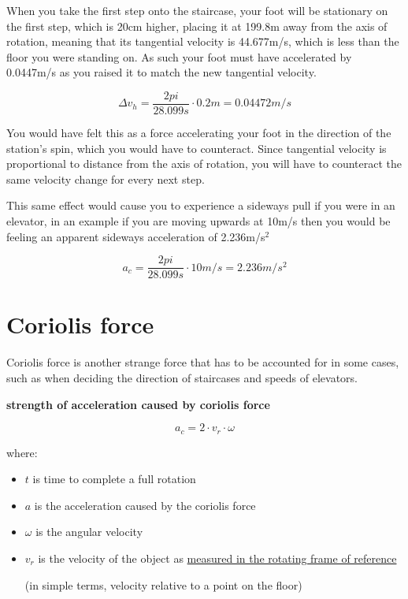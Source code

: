 \documentclass[a4paper]{article}
\begin{document}
	\medskip
	
	When you take the first step onto the staircase, your foot will be stationary on the first step, which is 20cm higher, placing it at 199.8m away from the axis of rotation, meaning that its tangential velocity is 44.677m/s, which is less than the floor you were standing on. As such your foot must have accelerated by 0.0447m/s as you raised it to match the new tangential velocity.
	
	$$ \Delta v_h = \frac{2pi}{28.099s} \cdot 0.2m = 0.04472m/s $$
	
	You would have felt this as a force accelerating your foot in the direction of the station's spin, which you would have to counteract. Since tangential velocity is proportional to distance from the axis of rotation, you will have to counteract the same velocity change for every next step.
	
	\medskip
	
	This same effect would cause you to experience a sideways pull if you were in an elevator, in an example if you are moving upwards at 10m/s then you would be feeling an apparent sideways acceleration of 2.236m/s$^2$
	
	$$ a_c = \frac{2pi}{28.099s} \cdot 10m/s = 2.236m/s^2 $$
	
	\pagebreak
	
	\iffalse
	
	\section{Coriolis force}
	
	Coriolis force is another strange force that has to be accounted for in some cases, such as when deciding the direction of staircases and speeds of elevators.
	
	\begin{center}
		\textbf{strength of acceleration caused by coriolis force}
	\end{center}
	
	$$ a_c = 2 \cdot v_r \cdot \omega $$
	
	where:
	
	\begin{itemize}
		\item $t$ is time to complete a full rotation
		
		\item $a$ is the acceleration caused by the coriolis force
		
		\item $\omega$ is the angular velocity
		
		\item $v_r$ is the velocity of the object as \underline{measured in the rotating frame of reference}
		
		(in simple terms, velocity relative to a point on the floor)
	\end{itemize}
	
\end{document}
